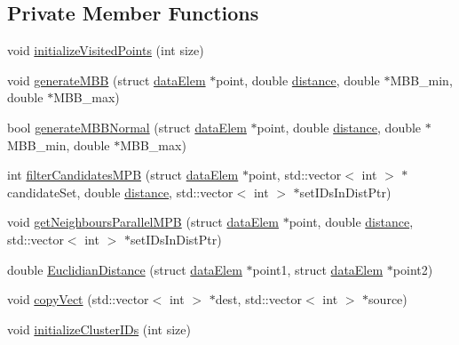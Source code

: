 \subsection*{Private Member Functions}
\begin{DoxyCompactItemize}
\item 
void \hyperlink{classDBScan_ab919d93ea8f7c4ef59d5112b05ec109b}{initialize\-Visited\-Points} (int size)
\item 
void \hyperlink{classDBScan_ae133eef10ed34bf676d46b1dee6af918}{generate\-M\-B\-B} (struct \hyperlink{structdataElem}{data\-Elem} $\ast$point, double \hyperlink{classDBScan_a9878125297973f29db8b41287e0c9b4d}{distance}, double $\ast$M\-B\-B\-\_\-min, double $\ast$M\-B\-B\-\_\-max)
\item 
bool \hyperlink{classDBScan_a8d882d909001edadc803668743908cc9}{generate\-M\-B\-B\-Normal} (struct \hyperlink{structdataElem}{data\-Elem} $\ast$point, double \hyperlink{classDBScan_a9878125297973f29db8b41287e0c9b4d}{distance}, double $\ast$M\-B\-B\-\_\-min, double $\ast$M\-B\-B\-\_\-max)
\item 
int \hyperlink{classDBScan_a62ea9b65ded887ede6d8b675aef2ce17}{filter\-Candidates\-M\-P\-B} (struct \hyperlink{structdataElem}{data\-Elem} $\ast$point, std\-::vector$<$ int $>$ $\ast$candidate\-Set, double \hyperlink{classDBScan_a9878125297973f29db8b41287e0c9b4d}{distance}, std\-::vector$<$ int $>$ $\ast$set\-I\-Ds\-In\-Dist\-Ptr)
\item 
void \hyperlink{classDBScan_ab8c34378017cfa3238a08986ba273522}{get\-Neighbours\-Parallel\-M\-P\-B} (struct \hyperlink{structdataElem}{data\-Elem} $\ast$point, double \hyperlink{classDBScan_a9878125297973f29db8b41287e0c9b4d}{distance}, std\-::vector$<$ int $>$ $\ast$set\-I\-Ds\-In\-Dist\-Ptr)
\item 
double \hyperlink{classDBScan_ab42218899ad9b1f5b432df5a3c0c82d3}{Euclidian\-Distance} (struct \hyperlink{structdataElem}{data\-Elem} $\ast$point1, struct \hyperlink{structdataElem}{data\-Elem} $\ast$point2)
\item 
void \hyperlink{classDBScan_af954708e115d00319a5cb53faffd52b1}{copy\-Vect} (std\-::vector$<$ int $>$ $\ast$dest, std\-::vector$<$ int $>$ $\ast$source)
\item 
void \hyperlink{classDBScan_acb4f0c75d09349200c0a354033d32e6c}{initialize\-Cluster\-I\-Ds} (int size)
\end{DoxyCompactItemize}
